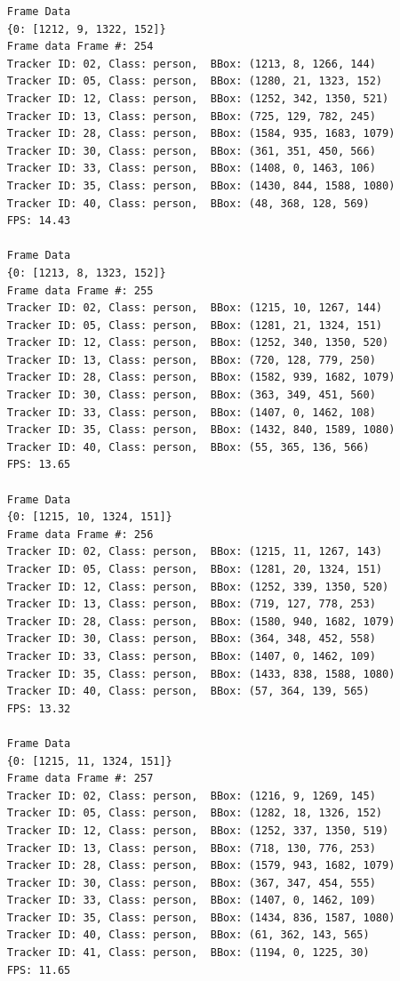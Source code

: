 \documentclass{fisatprojectfinal}
\begin{document}
\begin{verbatim}
    Frame Data
    {0: [1212, 9, 1322, 152]}
    Frame data Frame #: 254
    Tracker ID: 02, Class: person,  BBox: (1213, 8, 1266, 144)
    Tracker ID: 05, Class: person,  BBox: (1280, 21, 1323, 152)
    Tracker ID: 12, Class: person,  BBox: (1252, 342, 1350, 521)
    Tracker ID: 13, Class: person,  BBox: (725, 129, 782, 245)
    Tracker ID: 28, Class: person,  BBox: (1584, 935, 1683, 1079)
    Tracker ID: 30, Class: person,  BBox: (361, 351, 450, 566)
    Tracker ID: 33, Class: person,  BBox: (1408, 0, 1463, 106)
    Tracker ID: 35, Class: person,  BBox: (1430, 844, 1588, 1080)
    Tracker ID: 40, Class: person,  BBox: (48, 368, 128, 569)
    FPS: 14.43
    
    Frame Data
    {0: [1213, 8, 1323, 152]}
    Frame data Frame #: 255
    Tracker ID: 02, Class: person,  BBox: (1215, 10, 1267, 144)
    Tracker ID: 05, Class: person,  BBox: (1281, 21, 1324, 151)
    Tracker ID: 12, Class: person,  BBox: (1252, 340, 1350, 520)
    Tracker ID: 13, Class: person,  BBox: (720, 128, 779, 250)
    Tracker ID: 28, Class: person,  BBox: (1582, 939, 1682, 1079)
    Tracker ID: 30, Class: person,  BBox: (363, 349, 451, 560)
    Tracker ID: 33, Class: person,  BBox: (1407, 0, 1462, 108)
    Tracker ID: 35, Class: person,  BBox: (1432, 840, 1589, 1080)
    Tracker ID: 40, Class: person,  BBox: (55, 365, 136, 566)
    FPS: 13.65
    
    Frame Data
    {0: [1215, 10, 1324, 151]}
    Frame data Frame #: 256
    Tracker ID: 02, Class: person,  BBox: (1215, 11, 1267, 143)
    Tracker ID: 05, Class: person,  BBox: (1281, 20, 1324, 151)
    Tracker ID: 12, Class: person,  BBox: (1252, 339, 1350, 520)
    Tracker ID: 13, Class: person,  BBox: (719, 127, 778, 253)
    Tracker ID: 28, Class: person,  BBox: (1580, 940, 1682, 1079)
    Tracker ID: 30, Class: person,  BBox: (364, 348, 452, 558)
    Tracker ID: 33, Class: person,  BBox: (1407, 0, 1462, 109)
    Tracker ID: 35, Class: person,  BBox: (1433, 838, 1588, 1080)
    Tracker ID: 40, Class: person,  BBox: (57, 364, 139, 565)
    FPS: 13.32
    
    Frame Data
    {0: [1215, 11, 1324, 151]}
    Frame data Frame #: 257
    Tracker ID: 02, Class: person,  BBox: (1216, 9, 1269, 145)
    Tracker ID: 05, Class: person,  BBox: (1282, 18, 1326, 152)
    Tracker ID: 12, Class: person,  BBox: (1252, 337, 1350, 519)
    Tracker ID: 13, Class: person,  BBox: (718, 130, 776, 253)
    Tracker ID: 28, Class: person,  BBox: (1579, 943, 1682, 1079)
    Tracker ID: 30, Class: person,  BBox: (367, 347, 454, 555)
    Tracker ID: 33, Class: person,  BBox: (1407, 0, 1462, 109)
    Tracker ID: 35, Class: person,  BBox: (1434, 836, 1587, 1080)
    Tracker ID: 40, Class: person,  BBox: (61, 362, 143, 565)
    Tracker ID: 41, Class: person,  BBox: (1194, 0, 1225, 30)
    FPS: 11.65
    

\end{verbatim}
\end{document}
